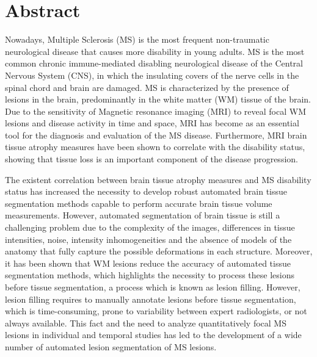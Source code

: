 \chapter*{Abstract}


Nowadays, Multiple Sclerosis (MS) is the most frequent non-traumatic neurological disease that causes more disability in young adults. MS is the most common chronic immune-mediated disabling neurological disease of the Central Nervous System (CNS), in which the insulating covers of the nerve cells in the spinal chord and brain are damaged. MS is characterized by the presence of lesions in the brain, predominantly in the white matter (WM) tissue of the brain. Due to the sensitivity of Magnetic resonance imaging (MRI) to reveal focal WM lesions and disease activity in time and space, MRI has become as an essential tool for the diagnosis and evaluation of the MS disease. Furthermore, MRI brain tissue atrophy measures have been shown to correlate with the disability status, showing that tissue loss is an important component of the disease progression. 

The existent correlation between brain tissue atrophy measures and MS disability status has increased the necessity to develop robust automated brain tissue segmentation methods capable to perform accurate brain tissue volume measurements. However, automated segmentation of brain tissue is still a challenging problem due to the complexity of the images, differences in tissue intensities, noise, intensity inhomogeneities and the absence of models of the anatomy that fully capture the possible deformations in each structure. Moreover, it has been shown that WM lesions reduce the accuracy of automated tissue segmentation methods, which highlights the necessity to process these lesions before tissue segmentation, a process which is known as lesion filling. However, lesion filling requires to manually annotate lesions before tissue segmentation, which is time-consuming, prone to variability between expert radiologists, or not always available. This fact and the need to analyze quantitatively focal MS lesions in individual and temporal studies has led to the development of a wide number of automated lesion segmentation of MS lesions. 

